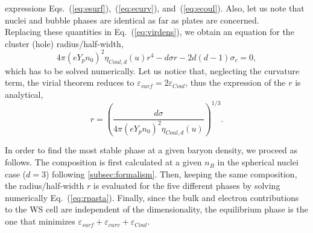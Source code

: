 expressions Eqs.~(\ref{eq:esurf}),~(\ref{eq:ecurv}), and~(\ref{eq:ecoul}). Also, let us
note that nuclei and bubble phases are identical as far as plates are concerned.\\
Replacing these quantities in Eq.~(\ref{eq:virdens}), we obtain an equation for
the cluster (hole) radius/half-width,
%
\begin{equation}
  4\pi(eY_pn_0)^2\eta_{Coul,d}(u){r}^4 - d\sigma r - 2d(d-1)\sigma_c 
  = 0,\label{eq:rpasta}
\end{equation}
%
which has to be solved numerically. Let us notice that, neglecting the 
curvature term, the virial theorem reduces 
to $\varepsilon_{surf} = 2\varepsilon_{Coul}$, thus the expression of the 
$r$ is analytical,
%
\begin{equation}
  r =
  \left(\frac{d\sigma}{4\pi(eY_pn_0)^2\eta_{Coul,d}(u)}\right)^{1/3}.
\end{equation}

In order to find the most stable phase at a given baryon density, we proceed as
follows. 
The composition is first calculated at a given $n_B$ in the spherical nuclei 
case ($d=3$) following \ref{subsec:formalism}. Then, keeping the same 
composition, the radius/half-width $r$ is evaluated for the five different 
phases by solving numerically Eq.~(\ref{eq:rpasta}). Finally, since the bulk
and electron contributions to the WS cell are independent of the 
dimensionality, the equilibrium phase is the one that minimizes 
$\varepsilon_{surf} + \varepsilon_{curv} 
+ \varepsilon_{Coul}$. 

